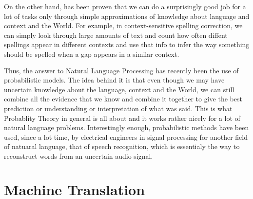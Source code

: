\documentclass[a4paper,10pt]{report}
\begin{document}
On the other hand, has been proven that we can do a surprisingly good job for a lot of tasks only through simple approximations of knowledge about language and context and the World. For example, in context-sensitive spelling correction, we can simply look through large amounts of text and count how often diffent spellings appear in different contexts and use that info to infer the way something should be spelled when a gap appears in a similar context.

Thus, the answer to Natural Language Processing has recently been the use of probabilistic models. The idea behind it is that even though we may have uncertain knowledge about the language, context and the World, we can still combine all the evidence that we know and combine it together to give the best prediction or understanding or interpretation of what was said. This is what Probablity Theory in general is all about and it works rather nicely for a lot of natural language problems. Interestingly enough, probabilistic methods have been used, since a lot time, by electrical engineers in signal processing for another field of natuaral language, that of speech recognition, which is essentialy the way to reconstruct words from an uncertain audio signal.

\chapter*{Machine Translation}
\end{document}
